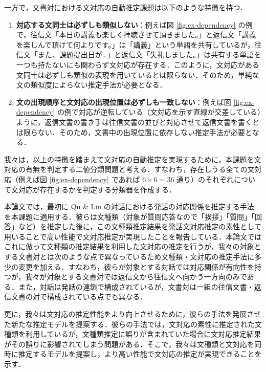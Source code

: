 \documentclass[japanese]{jnlp_1.4}
\begin{document}
一方で，文書対における文対応の自動推定課題は以下のような特徴を持つ．

\begin{enumerate}
  \renewcommand{\labelenumi}{}
  \item \textbf{対応する文同士は必ずしも類似しない}：例えば図 \ref{fig:ex-dependency} の例で，往信文「本日の講義も楽しく拝聴させて頂きました。」と返信文「講義を楽しんで頂けて何よりです。」は「講義」という単語を共有しているが，往信文「また、課題提出日が…」と返信文「失礼しました。」は共有する単語を一つも持たないにも関わらず文対応が存在する．このように，文対応がある文同士は必ずしも類似の表現を用いているとは限らない．そのため，単純な文の類似度によらない推定手法が必要となる．
  \item \textbf{文の出現順序と文対応の出現位置は必ずしも一致しない}：例えば図 \ref{fig:ex-dependency} の例で対応が逆転している（文対応を示す直線が交差している）ように，返信文書の書き手は往信文書の並びと対応させて返信文書を書くとは限らない．そのため，文書中の出現位置に依存しない推定手法が必要となる．
\end{enumerate}

我々は，以上の特徴を踏まえて文対応の自動推定を実現するために，本課題を文対応の有無を判定する二値分類問題と考える．すなわち，存在しうる全ての文対応（例えば図 \ref{fig:ex-dependency} であれば $6 \times 6=36$ 通り）のそれぞれについて文対応が存在するかを判定する分類器を作成する．

本論文では，最初に Qu \& Liu の対話における発話の対応関係を推定する手法 \cite{Zhonghua2012} を本課題に適用する．彼らは文種類（対象が質問応答なので「挨拶」「質問」「回答」など）を推定した後に，この文種類推定結果を発話文対応推定の素性として用いることで高い性能で文対応推定が実現したことを報告している．本論文ではこれに倣って文種類の推定結果を利用した文対応の推定を行うが，我々の対象とする文書対とは次のような点で異なっているため文種類・文対応の推定手法に多少の変更を加える．すなわち，彼らが対象とする対話では対応関係が有向性を持つが，我々が対象とする文書対では返信文から往信文へ向かう一方向のみである．また，対話は発話の連鎖で構成されているが，文書対は一組の往信文書・返信文書の対で構成されている点でも異なる．

更に，我々は文対応の推定性能をより向上させるために，彼らの手法を発展させた新たな推定モデルを提案する．彼らの手法では，文対応の素性に推定された文種類を利用しているが，文種類推定に誤りが含まれていた場合に文対応推定結果がその誤りに影響されてしまう問題がある．そこで，我々は文種類と文対応を同時に推定するモデルを提案し，より高い性能で文対応の推定が実現できることを示す．
\end{document}
